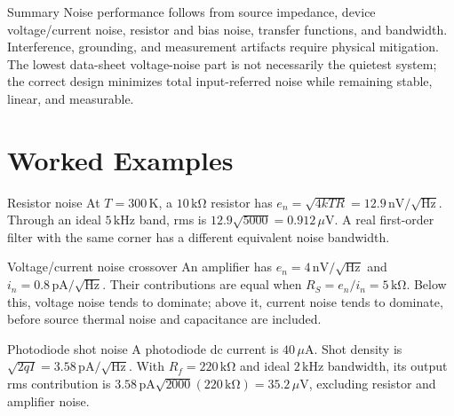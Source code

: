 \documentclass[10pt,letterpaper]{article}
\begin{document}
\begin{CornellSummaryBox}{Summary}
Noise performance follows from source impedance, device voltage/current noise, resistor and bias noise, transfer functions, and bandwidth. Interference, grounding, and measurement artifacts require physical mitigation. The lowest data-sheet voltage-noise part is not necessarily the quietest system; the correct design minimizes total input-referred noise while remaining stable, linear, and measurable.
\end{CornellSummaryBox}
\section{Worked Examples}
\begin{CornellExamBox}{Resistor noise}
At $T=300\,\mathrm{K}$, a $10\,\mathrm{k\Omega}$ resistor has $e_n=\sqrt{4kTR}=12.9\,\mathrm{nV}/\sqrt{\mathrm{Hz}}$. Through an ideal $5\,\mathrm{kHz}$ band, rms is $12.9\sqrt{5000}=0.912\,\mu\mathrm{V}$. A real first-order filter with the same corner has a different equivalent noise bandwidth.
\end{CornellExamBox}
\begin{CornellExamBox}{Voltage/current noise crossover}
An amplifier has $e_n=4\,\mathrm{nV}/\sqrt{\mathrm{Hz}}$ and $i_n=0.8\,\mathrm{pA}/\sqrt{\mathrm{Hz}}$. Their contributions are equal when $R_S=e_n/i_n=5\,\mathrm{k\Omega}$. Below this, voltage noise tends to dominate; above it, current noise tends to dominate, before source thermal noise and capacitance are included.
\end{CornellExamBox}
\begin{CornellExamBox}{Photodiode shot noise}
A photodiode dc current is $40\,\mu\mathrm{A}$. Shot density is $\sqrt{2qI}=3.58\,\mathrm{pA}/\sqrt{\mathrm{Hz}}$. With $R_f=220\,\mathrm{k\Omega}$ and ideal $2\,\mathrm{kHz}$ bandwidth, its output rms contribution is $3.58\,\mathrm{pA}\sqrt{2000}(220\,\mathrm{k\Omega})=35.2\,\mu\mathrm{V}$, excluding resistor and amplifier noise.
\end{CornellExamBox}
\end{document}
